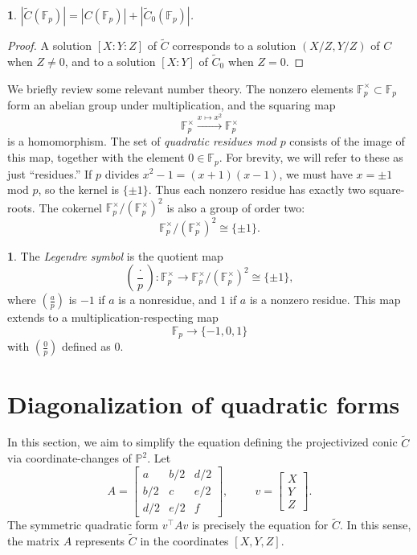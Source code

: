 \documentclass[10pt,a4paper]{amsart}
\numberwithin{equation}{section}
\numberwithin{figure}{section}
\theoremstyle{definition}
\theoremstyle{remark}
\theoremstyle{plain}
\theoremstyle{plain}
\theoremstyle{definition}
\newtheorem{defn}{\protect\definitionname}[section]
\theoremstyle{plain}
\theoremstyle{plain}
\newtheorem{lem}{\protect\lemmaname}[section]
\providecommand{\definitionname}{Definition}
\providecommand{\lemmaname}{Lemma}
\newcommand{\legendre}[2]{\genfrac{(}{)}{}{}{#1}{#2}}
\renewcommand{\P}{\mathbb{P}}
\newcommand{\F}{\mathbb{F}}
\begin{document}
    \begin{lem}\label{lem:relate-solutions-affine-proj}
        $|\widetilde{C}(\F_p)| = |C(\F_p)| + |\widetilde{C}_0(\F_p)|$.
    \end{lem} 
    \begin{proof}
        A solution $[X:Y:Z]$ of $\widetilde{C}$ corresponds 
        to a solution $(X/Z,Y/Z)$ of $C$ when $Z \neq 0$,
        and to a solution $[X:Y]$ of $\widetilde{C}_0$ 
        when $Z = 0$.  
    \end{proof}
	We briefly review some relevant number theory.
	The nonzero elements $\F_p^\times \subset \F_p$ form an abelian
	group under multiplication, and the squaring map 
	\[ \F^\times_p \xrightarrow{x \mapsto x^2} \F^\times_p \] 
	is a homomorphism. The set of \emph{quadratic residues mod $p$} consists of the image of this map, together with the element $0\in \F_p$. For brevity, we will refer to these as just ``residues.'' If $p$ divides $x^2 - 1 = (x+1)(x-1)$, we must have 
	$x = \pm 1$ mod $p$, so the kernel is $\{\pm 1\}$. Thus each nonzero residue has exactly two square-roots. 
	The cokernel $\F_p^\times / (\F_p^\times)^2$ is also a group of order two: 
	\[ \F_p^\times / (\F_p^\times)^2 \cong \{\pm 1\}.  \]
	\begin{defn}
		The \emph{Legendre symbol} is the quotient map    
		\[ \legendre{\cdot}{p}: 
		\F_p^\times \to \F_p^\times / (\F_p^\times)^2 \cong \{\pm 1\}, \]
		where $\legendre{a}{p}$ is $-1$ if $a$ is a nonresidue,
		and $1$ if $a$ is a nonzero residue. This map extends to a multiplication-respecting map
		\[ \F_p \to \{-1,0,1\} \]
		with $\legendre{0}{p}$ defined as $0$.
	\end{defn}
	
    \section{Diagonalization of quadratic forms}
    \label{sec:diagonalizing-quadratic-forms} 

    In this section, we aim to simplify the equation defining the projectivized conic $\widetilde{C}$ via coordinate-changes of $\P^2$. Let
	\begin{equation*}
	A=\begin{bmatrix}
	a&b/2&d/2\\
	b/2&c&e/2\\
	d/2&e/2&f
	\end{bmatrix}, \hspace{1cm}
	v = \begin{bmatrix}
	X\\
	Y\\
	Z
	\end{bmatrix}.
	\end{equation*}
	The symmetric quadratic form $v^\top A v$ is precisely the equation for $\widetilde{C}$. In this sense, the matrix $A$ represents $\widetilde{C}$ in the coordinates $[X,Y,Z]$.
	
\end{document}
